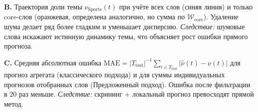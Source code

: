 \documentclass[14pt,a4paper]{article}
\begin{document}
\textbf{B.} Траектория доли темы \(\nu_{\text{Sports}}(t)\)  
при учёте всех слов (синяя линия) и только core-слов (оранжевая, определена аналогично, но сумма по \(\mathcal W_{\mathrm{core}}\)).  
Удаление шума делает ряд более гладким и уменьшает дисперсию.  
\emph{Следствие:} шумовые слова искажают истинную динамику темы, что объясняет рост ошибки прямого прогноза.

\textbf{C.} Средняя абсолютная ошибка  
\(\displaystyle \mathrm{MAE} = \lvert T_{\mathrm{test}}\rvert^{-1}\sum_{t\in T_{\mathrm{test}}}\lvert\widehat{\nu}(t)-\nu(t)\rvert\)  
для прогноз агрегата (классического подхода) и для суммы индивидуальных прогнозов отобранных слов (Предложенный подход).  
Ошибка после фильтрации в \(20\) раз меньше.  
\emph{Следствие:} скрининг + локальный прогноз превосходят прямой метод.
\end{document}
